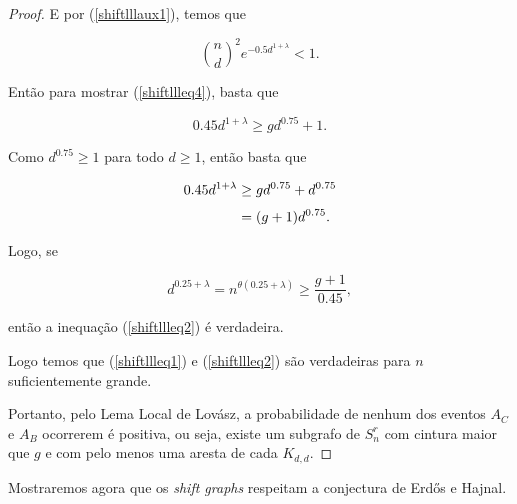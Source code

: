 \begin{proof}
E por (\ref{shiftlllaux1}), temos que

\[\binom{n}{d}^2e^{-0.5d^{1+\lambda}} < 1.\]

Então para mostrar (\ref{shiftllleq4}), basta que 

\[0.45d^{1+\lambda} \geq gd^{0.75} + 1.\]

Como $d^{0.75} \geq 1$ para todo $d \geq 1$, então basta que

\begin{equation*}
\setlength{\jot}{6pt}
\begin{aligned}
0.45d^{1+\lambda} &\geq gd^{0.75} + d^{0.75}\\
&= (g+1)d^{0.75}.
\end{aligned}
\end{equation*}

Logo, se

\[d^{0.25+\lambda} = n^{\theta(0.25+\lambda)} \geq \frac{g+1}{0.45},\]

então a inequação (\ref{shiftllleq2}) é verdadeira.



Logo temos que (\ref{shiftllleq1}) e (\ref{shiftllleq2}) são verdadeiras para $n$ suficientemente grande.

Portanto, pelo Lema Local de Lovász, a probabilidade de nenhum dos eventos $A_C$ e $A_B$ ocorrerem é positiva, ou seja, existe um subgrafo de $S_n^r$ com cintura maior que $g$ e com pelo menos uma aresta de cada $K_{d,d}$.

\end{proof}

Mostraremos agora que os \textit{shift graphs} respeitam a conjectura de Erd\H{o}s e Hajnal.

